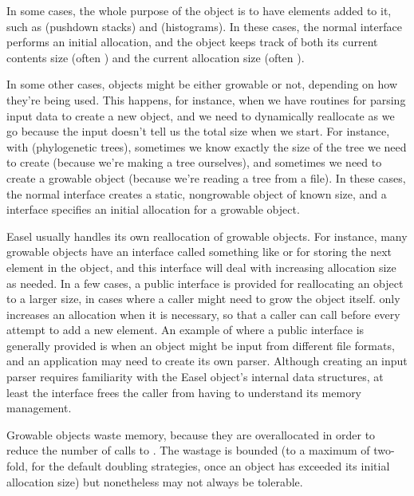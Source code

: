 In some cases, the whole purpose of the object is to have elements
added to it, such as  (pushdown stacks) and
 (histograms). In these cases, the normal
 interface performs an initial allocation, and the
object keeps track of both its current contents size (often
) and the current allocation size (often
). 

In some other cases, objects might be either growable or not,
depending on how they're being used. This happens, for instance, when
we have routines for parsing input data to create a new object, and we
need to dynamically reallocate as we go because the input doesn't tell
us the total size when we start. For instance, with 
(phylogenetic trees), sometimes we know exactly the size of the tree
we need to create (because we're making a tree ourselves), and
sometimes we need to create a growable object (because we're reading a
tree from a file). In these cases, the normal 
interface creates a static, nongrowable object of known size, and a
 interface specifies an initial allocation
for a growable object.

Easel usually handles its own reallocation of growable objects. For
instance, many growable objects have an interface called something
like  or  for storing the next element
in the object, and this interface will deal with increasing allocation
size as needed.  In a few cases, a public  interface
is provided for reallocating an object to a larger size, in cases
where a caller might need to grow the object itself. 
only increases an allocation when it is necessary, so that a caller
can call  before every attempt to add a new
element. An example of where a public  interface is
generally provided is when an object might be input from different
file formats, and an application may need to create its own
parser. Although creating an input parser requires familiarity with
the Easel object's internal data structures, at least the
 interface frees the caller from having to understand
its memory management.

Growable objects waste memory, because they are overallocated in order
to reduce the number of calls to .  The wastage is
bounded (to a maximum of two-fold, for the default doubling
strategies, once an object has exceeded its initial allocation size)
but nonetheless may not always be tolerable. 

